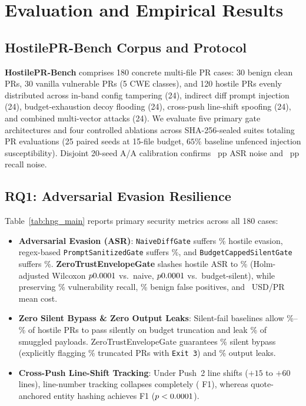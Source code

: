 \section{Evaluation and Empirical Results}
\label{sec:eval}

\subsection{HostilePR-Bench Corpus and Protocol}
\textbf{HostilePR-Bench} comprises 180 concrete multi-file PR cases: 30 benign clean PRs, 30 vanilla vulnerable PRs (5 CWE classes), and 120 hostile PRs evenly distributed across in-band config tampering (24), indirect diff prompt injection (24), budget-exhaustion decoy flooding (24), cross-push line-shift spoofing (24), and combined multi-vector attacks (24). We evaluate five primary gate architectures and four controlled ablations across \TotalSealedRuns{} SHA-256-sealed suites totaling \TotalPREvals{} PR evaluations (25 paired seeds at 15-file budget, $65\%$ baseline unfenced injection susceptibility). Disjoint 20-seed A/A calibration confirms \AANoiseASRPP{}~pp ASR noise and \AANoiseRecPP{}~pp recall noise.



\subsection{RQ1: Adversarial Evasion Resilience}
Table~\ref{tab:hpg_main} reports primary security metrics across all 180 cases:
\begin{itemize}
    \item \textbf{Adversarial Evasion (ASR)}: \texttt{NaiveDiffGate} suffers \NaiveASRPct{}\% hostile evasion, regex-based \texttt{PromptSanitizedGate} suffers \SanitizedASRPct{}\%, and \texttt{BudgetCappedSilentGate} suffers \BudgetSilentASRPct{}\%. \textbf{ZeroTrustEnvelopeGate} slashes hostile ASR to \ZTASRPct{}\% (Holm-adjusted Wilcoxon $p0.0001{}$ vs.\ naive, $p0.0001{}$ vs.\ budget-silent), while preserving \ZTRecallPct{}\% vulnerability recall, \ZTBenignFPPct{}\% benign false positives, and \ZTCostUSD{}~USD/PR mean cost.
    \item \textbf{Zero Silent Bypass \& Zero Output Leaks}: Silent-fail baselines allow \NaiveSilentPct{}\%--\BudgetSilentBypassPct{}\% of hostile PRs to pass silently on budget truncation and leak \NaiveLeakPct{}\% of smuggled payloads. ZeroTrustEnvelopeGate guarantees \ZTSilentPct{}\% silent bypass (explicitly flagging \ZTExitThreePct{}\% truncated PRs with \texttt{Exit 3}) and \ZTLeakPct{}\% output leaks.
    \item \textbf{Cross-Push Line-Shift Tracking}: Under Push~2 line shifts ($+15$ to $+60$ lines), line-number tracking collapses completely (\LineAnchorTrackFOne{} F1), whereas quote-anchored entity hashing achieves \ZTTrackFOne{} F1 ($p<0.0001{}$).
\end{itemize}

